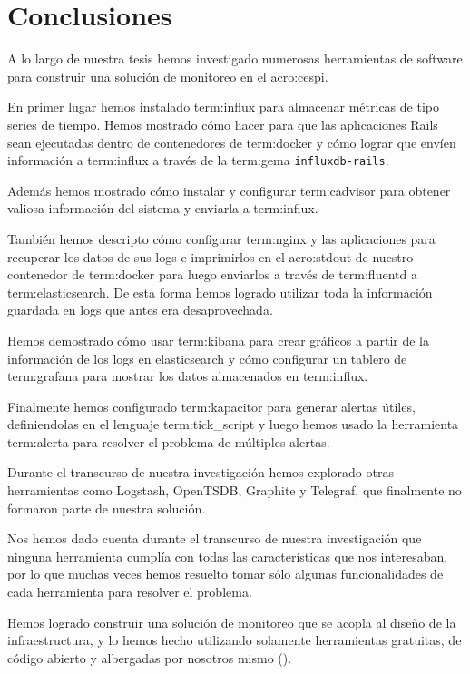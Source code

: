 \newpage
\section{Conclusiones}
\label{conclusiones}

A lo largo de nuestra tesis hemos investigado numerosas herramientas de
software para construir una solución de monitoreo en el \gls{acro:cespi}.

En primer lugar hemos instalado \gls{term:influx} para almacenar métricas de
tipo series de tiempo. Hemos mostrado cómo hacer para que las aplicaciones
Rails sean ejecutadas dentro de contenedores de \gls{term:docker} y cómo lograr
que envíen información a \gls{term:influx} a través de la \gls{term:gema}
\texttt{influxdb-rails}.

Además hemos mostrado cómo instalar y configurar \gls{term:cadvisor} para
obtener valiosa información del sistema y enviarla a \gls{term:influx}.

También hemos descripto cómo configurar \gls{term:nginx} y las aplicaciones
para recuperar los datos de sus logs e imprimirlos en el \gls{acro:stdout} de
nuestro contenedor de \gls{term:docker} para luego enviarlos a través de
\gls{term:fluentd} a \gls{term:elasticsearch}. De esta forma hemos logrado
utilizar toda la información guardada en logs que antes era desaprovechada.

Hemos demostrado cómo usar \gls{term:kibana} para crear gráficos a partir de la
información de los logs en elasticsearch y cómo configurar un tablero de
\gls{term:grafana} para mostrar los datos almacenados en \gls{term:influx}.

Finalmente hemos configurado \gls{term:kapacitor} para generar alertas útiles,
definiendolas en el lenguaje \gls{term:tick_script} y luego hemos usado la
herramienta \gls{term:alerta} para resolver el problema de múltiples alertas.

Durante el transcurso de nuestra investigación hemos explorado otras
herramientas como Logstash, OpenTSDB, Graphite y Telegraf, que finalmente no
formaron parte de nuestra solución.

Nos hemos dado cuenta durante el transcurso de nuestra investigación que
ninguna herramienta cumplía con todas las características que nos interesaban,
por lo que muchas veces hemos resuelto tomar sólo algunas funcionalidades de
cada herramienta para resolver el problema.

Hemos logrado construir una solución de monitoreo que se acopla al diseño de la
infraestructura, y lo hemos hecho utilizando solamente herramientas gratuitas,
de código abierto y albergadas por nosotros mismo ().

